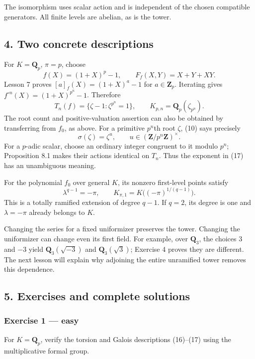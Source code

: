 \documentclass[11pt,a4paper]{article}
\begin{document}
The isomorphism uses scalar action and is independent of the chosen
compatible generators. All finite levels are abelian, as is the tower.

\subsection{4. Two concrete
descriptions}\label{two-concrete-descriptions}

For \(K=\mathbf Q_p\), \(\pi=p\), choose \[
f(X)=(1+X)^p-1,\qquad F_f(X,Y)=X+Y+XY.
\] Lesson 7 proves \([a]_f(X)=(1+X)^a-1\) for \(a\in\mathbf Z_p\).
Iterating gives \(f^{\circ n}(X)=(1+X)^{p^n}-1\). Therefore \[
T_n(f)=\{\zeta-1:\zeta^{p^n}=1\},\qquad
K_{p,n}=\mathbf Q_p(\zeta_{p^n}).
\tag{16}
\] The root count and positive-valuation assertion can also be obtained
by transferring from \(f_0\), as above. For a primitive \(p^n\)th root
\(\zeta\), (10) says precisely \[
\sigma(\zeta)=\zeta^u,\qquad u\in(\mathbf Z/p^n\mathbf Z)^\times.
\tag{17}
\] For a \(p\)-adic scalar, choose an ordinary integer congruent to it
modulo \(p^n\); Proposition 8.1 makes their actions identical on
\(T_n\). Thus the exponent in (17) has an unambiguous meaning.

For the polynomial \(f_0\) over general \(K\), its nonzero first-level
points satisfy \[
\lambda^{q-1}=-\pi,\qquad
K_{\pi,1}=K\bigl((-\pi)^{1/(q-1)}\bigr).
\tag{18}
\] This is a totally ramified extension of degree \(q-1\). If \(q=2\),
its degree is one and \(\lambda=-\pi\) already belongs to \(K\).

Changing the series for a fixed uniformizer preserves the tower.
Changing the uniformizer can change even its first field. For example,
over \(\mathbf Q_3\), the choices \(3\) and \(-3\) yield
\(\mathbf Q_3(\sqrt{-3})\) and \(\mathbf Q_3(\sqrt3)\); Exercise 4
proves they are different. The next lesson will explain why adjoining
the entire unramified tower removes this dependence.

\subsection{5. Exercises and complete
solutions}\label{exercises-and-complete-solutions}

\subsubsection{Exercise 1 --- easy}\label{exercise-1-easy}

For \(K=\mathbf Q_p\), verify the torsion and Galois descriptions
(16)--(17) using the multiplicative formal group.
\end{document}
